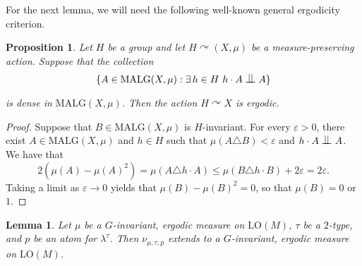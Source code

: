 \documentclass[JEP,XML,SOM,Unicode,published]{cedram}
\let\actson\curvearrowright
\let\eps\varepsilon
\let\sdiff\triangle
\theoremstyle{plain}
\newtheorem{lemma}[theorem]{Lemma}
\newtheorem{prop}[theorem]{Proposition}
\theoremstyle{definition}
\DeclarePairedDelimiter\set{\{}{\}}
\newcommand{\LO}{\mathrm{LO}}
\newcommand{\MALG}{\mathrm{MALG}}
\newcommand{\indep}[1][]{%
  \mathrel{
    \mathop{
      \scalebox{1}[1.3]{\text{$\perp\!\!\!\perp$}}
    }\displaylimits_{#1}
  }
}
\begin{document}
For the next lemma, we will need the following well-known general ergodicity criterion.
\begin{prop}
\label{p:indep-ergodicity}
Let $H$ be a group and let $H \actson (X, \mu)$ be a measure-preserving action. Suppose that the collection
\begin{equation*}
\set{A \in \MALG(X, \mu) : \exists\, h \in H \ h \cdot A \indep A}
\end{equation*}
is dense in $\MALG(X, \mu)$. Then the action $H \actson X$ is ergodic.
\end{prop}
\begin{proof}
Suppose that $B \in \MALG(X, \mu)$ is $H$-invariant. For every $\eps > 0$, there exist $A \in \MALG(X, \mu)$ and $h \in H$ such that $\mu(A \sdiff B) < \eps$ and $h \cdot A \indep A$. We have that
\begin{equation*}
2(\mu(A) - \mu(A)^2) = \mu(A \sdiff h \cdot A) \leq \mu(B \sdiff h \cdot B) + 2\eps = 2\eps.
\end{equation*}
Taking a limit as $\eps \to 0$ yields that $\mu(B) - \mu(B)^2 = 0$, so that $\mu(B) = 0$ or $1$.
\end{proof}
\begin{lemma}
\label{Lem:measures}
Let $\mu$ be a $G$-invariant, ergodic measure on $\LO(M)$, $\tau$ be a $2$-type, and $p$ be an atom for $\lambda^\tau$. Then $\nu_{\mu, \tau, p}$ extends to a $G$-invariant, ergodic measure on $\LO(M)$.
\end{lemma}
\end{document}
